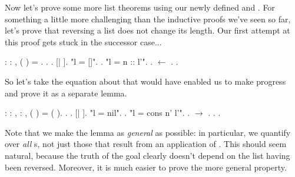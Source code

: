 \documentclass[12pt]{report}
\begin{document}
 Now let's prove some more list theorems using our newly
    defined  and .  For something a little more challenging
    than the inductive proofs we've seen so far, let's prove that
    reversing a list does not change its length.  Our first attempt at
    this proof gets stuck in the successor case... \begin{coqdoccode}
\coqdocemptyline
\coqdocnoindent
{}  : \coqdockw{\ensuremath{\forall}}  : ,\coqdoceol
\coqdocindent{1.00em}
 ( ) =  .\coqdoceol
\coqdocnoindent
{}.\coqdoceol
\coqdocindent{1.00em}
 .    [|  ].\coqdoceol
\coqdocindent{1.00em}
 "l = []".\coqdoceol
\coqdocindent{2.00em}
.\coqdoceol
\coqdocindent{1.00em}
 "l = n :: l'".\coqdoceol
\coqdocindent{2.00em}
.\coqdoceol
\coqdocindent{2.00em}
 \ensuremath{\leftarrow} .\coqdoceol
\coqdocnoindent
{}.\coqdoceol
\coqdocemptyline
\end{coqdoccode}
So let's take the equation about  that would have
    enabled us to make progress and prove it as a separate lemma. 
\begin{coqdoccode}
\coqdocemptyline
\coqdocnoindent
{}  : \coqdockw{\ensuremath{\forall}}  : , \coqdockw{\ensuremath{\forall}}  : ,\coqdoceol
\coqdocindent{1.00em}
 (  ) =  ( ).\coqdoceol
\coqdocnoindent
{}.\coqdoceol
\coqdocindent{1.00em}
  .    [|  ].\coqdoceol
\coqdocindent{1.00em}
 "l = nil".\coqdoceol
\coqdocindent{2.00em}
.\coqdoceol
\coqdocindent{1.00em}
 "l = cons n' l'".\coqdoceol
\coqdocindent{2.00em}
.  \ensuremath{\rightarrow} . . .\coqdoceol
\coqdocemptyline
\end{coqdoccode}
    Note that we make the lemma as \textit{general} as possible: in particular,
    we quantify over \textit{all} s, not just those that result
    from an application of . This should seem natural, 
    because the truth of the goal clearly doesn't depend on 
    the list having been reversed.  Moreover, it is much easier
    to prove the more general property. 
\end{document}

